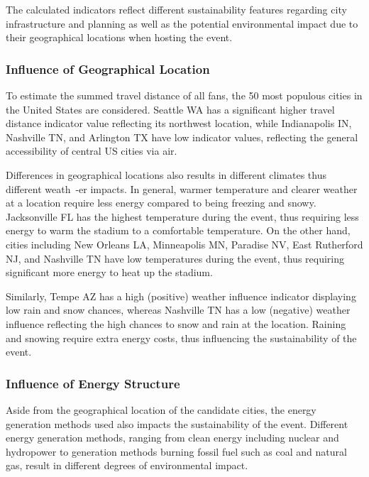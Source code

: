\documentclass{mcmthesis}
\begin{document}
The calculated indicators reflect different sustainability features regarding city infrastructure and planning as well as the potential environmental impact due to their geographical locations when hosting the event. %


\subsubsection{Influence of Geographical Location} \label{subsubsec:indicator_insights_location}

To estimate the summed travel distance of all fans, the 50 most populous cities in the United States are considered. Seattle WA has a significant higher travel distance indicator value reflecting its northwest location, while Indianapolis IN, Nashville TN, and Arlington TX have low indicator values, reflecting the general accessibility of central US cities via air. 

Differences in geographical locations also results in different climates thus different weath\ -er impacts. In general, warmer temperature and clearer weather at a location require less energy compared to being freezing and snowy. Jacksonville FL has the highest temperature during the event, thus requiring less energy to warm the stadium to a comfortable temperature. On the other hand, cities including New Orleans LA, Minneapolis MN, Paradise NV, East Rutherford NJ, and Nashville TN have low temperatures during the event, thus requiring significant more energy to heat up the stadium. 

Similarly, Tempe AZ has a high (positive) weather influence indicator displaying low rain and snow chances, whereas Nashville TN has a low (negative) weather influence reflecting the high chances to snow and rain at the location. Raining and snowing require extra energy costs, thus influencing the sustainability of the event. 

\subsubsection{Influence of Energy Structure} \label{subsubsec:indicator_insights_energy}

Aside from the geographical location of the candidate cities, the energy generation methods used also impacts the sustainability of the event. Different energy generation methods, ranging from clean energy including nuclear and hydropower to generation methods burning fossil fuel such as coal and natural gas, result in different degrees of environmental impact. 
\end{document}
